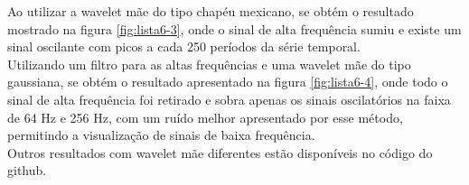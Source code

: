 \documentclass[12pt,a4paper,portuguese]{article}
\begin{document}
Ao utilizar a wavelet mãe do tipo chapéu mexicano, se obtém o resultado mostrado na figura \ref{fig:lista6-3}, onde o sinal de alta frequência sumiu e existe um sinal oscilante com picos a cada 250 períodos da série temporal.  \\

Utilizando um filtro para as altas frequências e uma wavelet mãe do tipo gaussiana, se obtém o resultado apresentado na figura \ref{fig:lista6-4}, onde todo o sinal de alta frequência foi retirado e sobra apenas os sinais oscilatórios na faixa de 64 Hz e 256 Hz, com um ruído melhor apresentado por esse método, permitindo a visualização de sinais de baixa frequência. \\

Outros resultados com wavelet mãe diferentes estão disponíveis no código do github.
\end{document}
